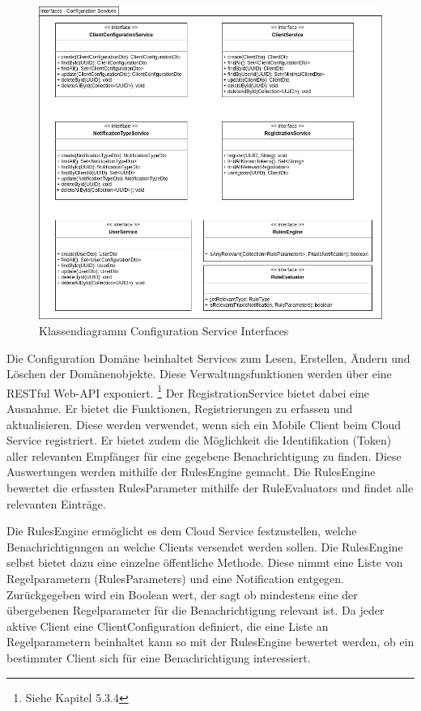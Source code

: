 \begin{figure}[h]
    \centering
    \begin{minipage}[b]{0.9\textwidth}
        \includegraphics[width=\textwidth]{graphics/Class_Configuration_Services}
        \caption{Klassendiagramm Configuration Service Interfaces}
    \end{minipage}
\end{figure}

Die Configuration Domäne beinhaltet Services zum Lesen, Erstellen, Ändern und Löschen der Domänenobjekte.
Diese Verwaltungsfunktionen werden über eine RESTful Web-API exponiert. \footnote{Siehe Kapitel 5.3.4}
Der RegistrationService bietet dabei eine Ausnahme.
Er bietet die Funktionen, Registrierungen zu erfassen und aktualisieren.
Diese werden verwendet, wenn sich ein Mobile Client beim Cloud Service registriert.
Er bietet zudem die Möglichkeit die Identifikation (Token) aller relevanten Empfänger für eine gegebene Benachrichtigung zu finden.
Diese Auswertungen werden mithilfe der RulesEngine gemacht.
Die RulesEngine bewertet die erfassten RulesParameter mithilfe der RuleEvaluators und findet alle relevanten Einträge.

Die RulesEngine ermöglicht es dem Cloud Service festzustellen, welche Benachrichtigungen an welche Clients versendet werden sollen.
Die RulesEngine selbst bietet dazu eine einzelne öffentliche Methode.
Diese nimmt eine Liste von Regelparametern (RulesParameters) und eine Notification entgegen.
Zurückgegeben wird ein Boolean wert, der sagt ob mindestens eine der übergebenen Regelparameter für die Benachrichtigung relevant ist.
Da jeder aktive Client eine ClientConfiguration definiert, die eine Liste an Regelparametern beinhaltet kann so mit der RulesEngine bewertet werden, ob ein bestimmter Client sich für eine Benachrichtigung interessiert.

